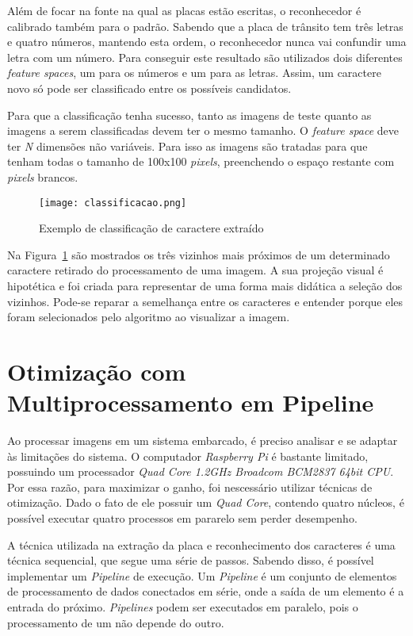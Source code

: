Além de focar na fonte na qual as placas estão escritas, o reconhecedor é
calibrado também para o padrão. Sabendo que a placa de trânsito tem três letras
e quatro números, mantendo esta ordem, o reconhecedor nunca vai confundir uma
letra com um número. Para conseguir este resultado são utilizados dois
diferentes \emph{feature spaces}, um para os números e um para as letras. Assim,
um caractere novo só pode ser classificado entre os possíveis candidatos.

Para que a classificação tenha sucesso, tanto as imagens de teste quanto as
imagens a serem classificadas devem ter o mesmo tamanho. O \emph{feature space}
deve ter \emph{N} dimensões não variáveis. Para isso as imagens são tratadas
para que tenham todas o tamanho de 100x100 \emph{pixels}, preenchendo o espaço
restante com \emph{pixels} brancos.

\begin{figure}[H]
	\centering
	\texttt{[image: classificacao.png]}
	\caption{Exemplo de classificação de caractere extraído}
	\label{fig:classificacao}
\end{figure}

Na Figura~\ref{fig:classificacao} são mostrados os três vizinhos mais próximos
de um determinado caractere retirado do processamento de uma imagem. A sua
projeção visual é hipotética e foi criada para representar de uma forma mais
didática a seleção dos vizinhos. Pode-se reparar a semelhança entre os
caracteres e entender porque eles foram selecionados pelo algoritmo ao
visualizar a imagem.

\section{Otimização com Multiprocessamento em Pipeline} \label{sec:otimizacao}

Ao processar imagens em um sistema embarcado, é preciso analisar e se adaptar às
limitações do sistema. O computador \emph{Raspberry Pi} é bastante limitado,
possuindo um processador \emph{Quad Core 1.2GHz Broadcom BCM2837 64bit CPU}. Por
essa razão, para maximizar o ganho, foi nescessário utilizar técnicas de
otimização. Dado o fato de ele possuir um \emph{Quad Core}, contendo quatro
núcleos, é possível executar quatro processos em pararelo sem perder desempenho.

A técnica utilizada na extração da placa e reconhecimento dos caracteres é uma
técnica sequencial, que segue uma série de passos. Sabendo disso, é possível
implementar um \emph{Pipeline} de execução. Um \emph{Pipeline} é um conjunto de
elementos de processamento de dados conectados em série, onde a saída de um
elemento é a entrada do próximo. \emph{Pipelines} podem ser executados em
paralelo, pois o processamento de um não depende do outro.

